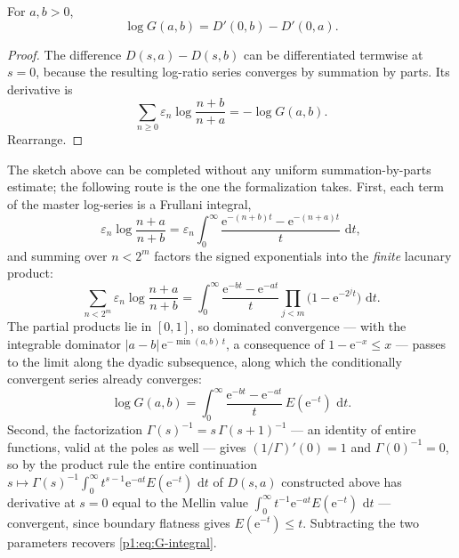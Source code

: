 \documentclass[11pt,oneside]{article}
\numberwithin{equation}{section}
\theoremstyle{definition}
\theoremstyle{remark}
\newcommand{\e}{\mathrm e}
\newcommand{\dd}{\,\mathrm d}
\newcommand{\eps}{\varepsilon}
\begin{document}
\begin{corollary}
\label{p1:cor:G-Dirichlet}
For \(a,b>0\),
\begin{equation}
  \boxed{
  \log G(a,b)=D'(0,b)-D'(0,a).}
  \label{p1:eq:G-Dirichlet}
\end{equation}
\end{corollary}

\begin{proof}
The difference \(D(s,a)-D(s,b)\) can be differentiated termwise at
\(s=0\), because the resulting log-ratio series converges by summation by
parts.  Its derivative is
\[
 \sum_{n\ge0}\eps_n
 \log\frac{n+b}{n+a}=-\log G(a,b).
\]
Rearrange.
\end{proof}

\begin{remark}
\label{p1:rem:G-Dirichlet-route}
The sketch above can be completed without any uniform
summation-by-parts estimate; the following route is the one the
formalization takes.  First, each term of the master log-series is a
Frullani integral,
\[
  \eps_n\log\frac{n+a}{n+b}
  =\eps_n\int_0^\infty
   \frac{\e^{-(n+b)t}-\e^{-(n+a)t}}{t}\,\dd t ,
\]
and summing over \(n<2^m\) factors the signed exponentials into the
\emph{finite} lacunary product:
\[
  \sum_{n<2^m}\eps_n\log\frac{n+a}{n+b}
  =\int_0^\infty\frac{\e^{-bt}-\e^{-at}}{t}
    \prod_{j<m}\bigl(1-\e^{-2^jt}\bigr)\,\dd t .
\]
The partial products lie in \([0,1]\), so dominated convergence ---
with the integrable dominator \(|a-b|\,\e^{-\min(a,b)\,t}\), a
consequence of \(1-\e^{-x}\le x\) --- passes to the limit along the
dyadic subsequence, along which the conditionally convergent series
already converges:
\begin{equation}
  \log G(a,b)
  =\int_0^\infty\frac{\e^{-bt}-\e^{-at}}{t}\,
   E(\e^{-t})\,\dd t .
  \label{p1:eq:G-integral}
\end{equation}
Second, the factorization \(\Gamma(s)^{-1}=s\,\Gamma(s+1)^{-1}\)
--- an identity of entire functions, valid at the poles as well ---
gives \((1/\Gamma)'(0)=1\) and \(\Gamma(0)^{-1}=0\), so by the
product rule the entire continuation
\(s\mapsto\Gamma(s)^{-1}\int_0^\infty
t^{s-1}\e^{-at}E(\e^{-t})\,\dd t\) of \(D(s,a)\) constructed
above has derivative at \(s=0\) equal to the Mellin value
\(\int_0^\infty t^{-1}\e^{-at}E(\e^{-t})\,\dd t\) ---
convergent, since boundary flatness gives \(E(\e^{-t})\le t\).
Subtracting the two parameters recovers \eqref{p1:eq:G-integral}.
\end{remark}
\end{document}
